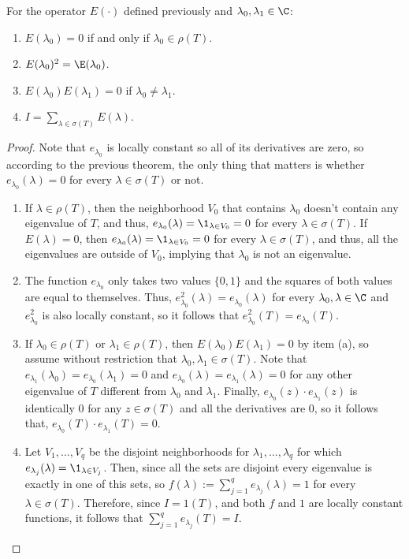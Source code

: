 \begin{theorem} For the operator $E(\cdot)$ defined previously and $\lambda_0,\lambda_1 \in \C$:
    \begin{enumerate}[label = (\alph*)]
        \item $E(\lambda_0) = 0$ if and only if $\lambda_0 \in \rho(T)$.
        \item $E(\lambda_0)^2 = \E(\lambda_0) $.
        \item $E(\lambda_0)E(\lambda_1) = 0$ if $\lambda_0 \neq \lambda_1$.
        \item $I = \sum_{\lambda \in \sigma(T)} E(\lambda)$.
    \end{enumerate}
\end{theorem}

\begin{proof}Note that $e_{\lambda_0}$ is locally constant so all of its derivatives are zero, so according to the previous theorem, the only thing that matters is whether $e_{\lambda_0}(\lambda) = 0$ for every $\lambda \in \sigma(T)$ or not.
    \begin{enumerate}[label = (\alph*)]
        \item  If $\lambda \in \rho(T)$, then the neighborhood $V_0$ that contains $\lambda_0$ doesn't contain any eigenvalue of $T$, and thus, $e_{\lambda_0}(\lambda) = \1_{\lambda \in V_0} = 0$ for every $\lambda \in \sigma(T)$. If $E(\lambda) = 0$, then $e_{\lambda_0}(\lambda) = \1_{\lambda \in V_0} = 0$ for every $\lambda \in \sigma(T)$, and thus, all the eigenvalues are outside of $V_0$, implying that $\lambda_0$ is not an eigenvalue.
        \item The function $e_{\lambda_0}$ only takes two values $\{0,1\}$ and the squares of both values are equal to themselves. Thus, $e_{\lambda_0}^2(\lambda) = e_{\lambda_0}(\lambda)$ for every $\lambda_0, \lambda \in \C$ and $e_{\lambda_0}^2$ is also locally constant, so it follows that $e_{\lambda_0}^2(T) = e_{\lambda_0}(T)$.
        \item If $\lambda_0 \in \rho(T)$ or $\lambda_1 \in \rho(T)$, then $E(\lambda_0)E(\lambda_1) = 0$ by item (a), so assume without restriction that $\lambda_0,\lambda_1 \in \sigma(T)$. Note that $e_{\lambda_1}(\lambda_0) = e_{\lambda_0}(\lambda_1) = 0$ and $e_{\lambda_0}(\lambda) = e_{\lambda_1}(\lambda) = 0$ for any other eigenvalue of $T$ different from $\lambda_0$ and $\lambda_1$. Finally, $e_{\lambda_0}(z)\cdot e_{\lambda_1}(z)$ is identically 0 for any $z \in \sigma(T)$ and all the derivatives are 0, so it follows that, $e_{\lambda_0}(T)\cdot e_{\lambda_1}(T) = 0$.
        \item Let $V_1,\ldots, V_q$ be the disjoint neighborhoods for $\lambda_1, \ldots, \lambda_q$ for which $e_{\lambda_j}(\lambda) = \1_{\lambda \in V_j}$. Then, since all the sets are disjoint every eigenvalue is exactly in one of this sets, so $f(\lambda) := \sum_{j = 1}^{q}e_{\lambda_j}(\lambda) = 1$ for every $\lambda \in \sigma(T)$. Therefore, since $I = 1(T)$, and both $f$ and $1$ are locally constant functions, it follows that $\sum_{j = 1}^{q}e_{\lambda_j}(T) = I$.
    \end{enumerate}
\end{proof}

